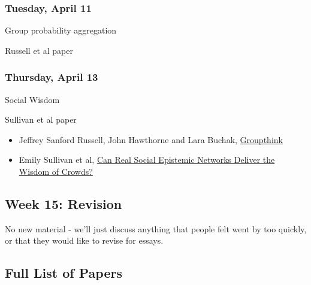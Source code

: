 \documentclass[
]{article}
\providecommand{\tightlist}{%
  \setlength{\itemsep}{0pt}\setlength{\parskip}{0pt}}
\begin{document}
\begin{multicols}{2}

\hypertarget{tuesday-april-11}{%
\subsubsection{Tuesday, April 11}\label{tuesday-april-11}}

\begin{description}
\tightlist
\item[Topic]
Group probability aggregation
\item[Reading]
Russell et al paper
\end{description}

\hypertarget{thursday-april-13}{%
\subsubsection{Thursday, April 13}\label{thursday-april-13}}

\begin{description}
\tightlist
\item[Topic]
Social Wisdom
\item[Reading]
Sullivan et al paper
\end{description}

\end{multicols}

\begin{itemize}
\tightlist
\item
  Jeffrey Sanford Russell, John Hawthorne and Lara Buchak,
  \href{https://philpapers.org/rec/RUSG}{Groupthink}
\item
  Emily Sullivan et al,
  \href{https://philarchive.org/archive/SULCRS}{Can Real Social
  Epistemic Networks Deliver the Wisdom of Crowds?}
\end{itemize}

\hypertarget{week-15-revision}{%
\subsection{Week 15: Revision}\label{week-15-revision}}

No new material - we'll just discuss anything that people felt went by
too quickly, or that they would like to revise for essays.

\newpage

\hypertarget{full-list-of-papers}{%
\subsection{Full List of Papers}\label{full-list-of-papers}}
\end{document}
